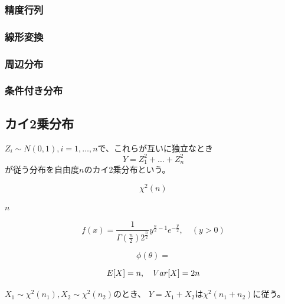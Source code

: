 \subsubsection{精度行列}

\subsubsection{線形変換}

\subsubsection{周辺分布}

\subsubsection{条件付き分布}


\subsection{カイ2乗分布}

\begin{outline}[description]
  \1 [定義] \(Z_i \sim N(0, 1), i = 1, \dots, n\)で、これらが互いに独立なとき
  \begin{equation}
    Y = Z_1^2 + \dots + Z_n^2
  \end{equation}
  が従う分布を自由度\(n\)のカイ2乗分布という。
  
  \1 [表記]
  \begin{equation}
    \chi^2(n)
  \end{equation}
  
  \1 [パラメータ]
  \2
  \2 [自由度] \(n\)
  
  \1 [密度関数]
  \begin{equation}
    f (x) = \frac{1}{\Gamma(\frac{n}{2}) 2^{\frac{n}{2}}}
    y^{\frac{n}{2} - 1} e^{- \frac{y}{2}}, \quad (y > 0)
  \end{equation}
  
  \1 [積率母関数]
  \begin{equation}
    \phi(\theta) = 
  \end{equation}
  
  \1 [期待値・分散]
  \begin{equation}
    E \qty [X] = n, \quad Var \qty [ X ] = 2n
  \end{equation}
  
  \1 [再生性]
  \(X_1 \sim \chi^2(n_1), X_2 \sim \chi^2(n_2)\)のとき、
  \(Y = X_1 + X_2\)は\(\chi^2(n_1 + n_2)\)に従う。
  
\end{outline}


